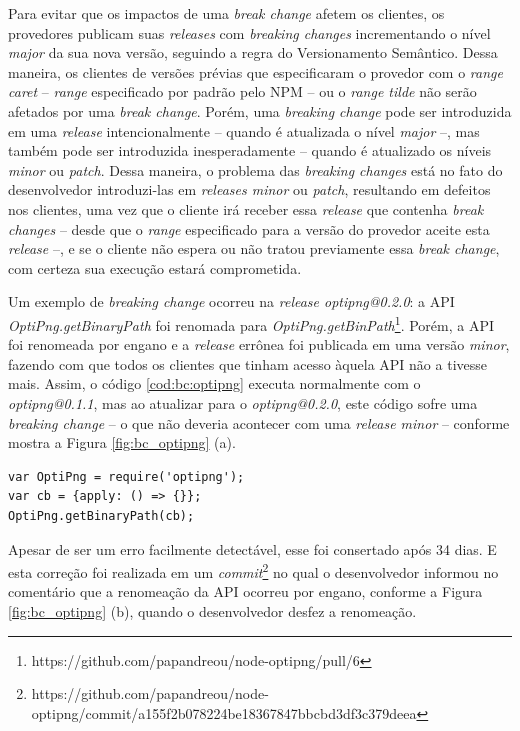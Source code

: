 Para evitar que os impactos de uma \textit{break change} afetem os clientes, os provedores publicam suas \textit{releases} com \textit{breaking changes} incrementando o nível \textit{major} da sua nova versão, seguindo a regra do Versionamento Semântico. Dessa maneira, os clientes de versões prévias que especificaram o provedor com o \textit{range caret} -- \textit{range} especificado por padrão pelo \gls{NPM} -- ou o \textit{range tilde} não serão afetados por uma \textit{break change}. Porém, uma \textit{breaking change} pode ser introduzida em uma \textit{release} intencionalmente -- quando é atualizada o nível \textit{major} --, mas também pode ser introduzida inesperadamente -- quando é atualizado os níveis \textit{minor} ou \textit{patch}. Dessa maneira, o problema das \textit{breaking changes} está no fato do desenvolvedor introduzi-las em \textit{releases minor} ou \textit{patch}, resultando em defeitos nos clientes, uma vez que o cliente irá receber essa \textit{release} que contenha \textit{break changes} -- desde que o \textit{range} especificado para a versão do provedor aceite esta \textit{release} --, e se o cliente não espera ou não tratou previamente essa \textit{break change}, com certeza sua execução estará comprometida.

Um exemplo de \textit{breaking change} ocorreu na \textit{release optipng@0.2.0}: a \gls{API} \textit{OptiPng.getBinaryPath} foi renomada para \textit{OptiPng.getBinPath}\footnote{https://github.com/papandreou/node-optipng/pull/6}. Porém, a \gls{API} foi renomeada por engano e a \textit{release} errônea foi publicada em uma versão \textit{minor}, fazendo com que todos os clientes que tinham acesso àquela \gls{API} não a tivesse mais. Assim, o código \ref{cod:bc:optipng} executa normalmente com o \textit{optipng@0.1.1}, mas ao atualizar para o \textit{optipng@0.2.0}, este código sofre uma \textit{breaking change} -- o que não deveria acontecer com uma \textit{release minor}  -- conforme mostra a Figura \ref{fig:bc_optipng} (a).

\begin{lstlisting}[style=Javascript, label=cod:bc:optipng, caption={Código que sofre \textit{breaking change} do \textit{optipng}}]
var OptiPng = require('optipng');
var cb = {apply: () => {}};
OptiPng.getBinaryPath(cb);
\end{lstlisting}

Apesar de ser um erro facilmente detectável, esse foi consertado após 34 dias. E esta correção foi realizada em um \textit{commit}\footnote{https://github.com/papandreou/node-optipng/commit/a155f2b078224be18367847bbcbd3df3c379deea} no qual o desenvolvedor informou no comentário que a renomeação da \gls{API} ocorreu por engano, conforme a Figura \ref{fig:bc_optipng} (b), quando o desenvolvedor desfez a renomeação.

